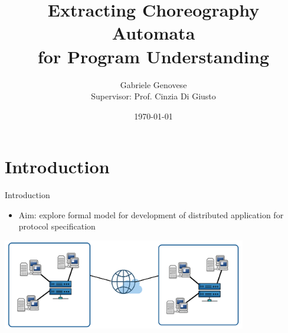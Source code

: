 \documentclass{beamer}
\title{Extracting Choreography Automata \\ for Program Understanding}
\author{Gabriele Genovese \\ Supervisor: Prof. Cinzia Di Giusto}
\date{\today}
\begin{document}
\frame{\titlepage}

%


\section{Introduction}
\begin{frame}{Introduction}
\begin{itemize}
    \item Aim: explore formal model for development of 
    distributed application for protocol specification
\end{itemize}
\bigskip
\begin{center}
\includegraphics[width=0.8\textwidth]{images/crop.png}
\end{center}
\end{frame}
\end{document}
